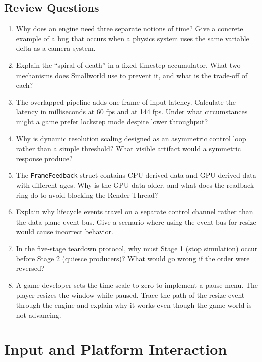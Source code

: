 \documentclass[
  11pt,
  letterpaper,
  DIV=11,
  numbers=noendperiod,
  twoside,
  open=right]{scrreprt}
\begin{document}
\section*{Review Questions}\label{review-questions-3}


\begin{enumerate}
\def\labelenumi{\arabic{enumi}.}
\item
  Why does an engine need three separate notions of time? Give a
  concrete example of a bug that occurs when a physics system uses the
  same variable delta as a camera system.
\item
  Explain the ``spiral of death'' in a fixed-timestep accumulator. What
  two mechanisms does Smallworld use to prevent it, and what is the
  trade-off of each?
\item
  The overlapped pipeline adds one frame of input latency. Calculate the
  latency in milliseconds at 60 fps and at 144 fps. Under what
  circumstances might a game prefer lockstep mode despite lower
  throughput?
\item
  Why is dynamic resolution scaling designed as an asymmetric control
  loop rather than a simple threshold? What visible artifact would a
  symmetric response produce?
\item
  The \texttt{FrameFeedback} struct contains CPU-derived data and
  GPU-derived data with different ages. Why is the GPU data older, and
  what does the readback ring do to avoid blocking the Render Thread?
\item
  Explain why lifecycle events travel on a separate control channel
  rather than the data-plane event bus. Give a scenario where using the
  event bus for resize would cause incorrect behavior.
\item
  In the five-stage teardown protocol, why must Stage 1 (stop
  simulation) occur before Stage 2 (quiesce producers)? What would go
  wrong if the order were reversed?
\item
  A game developer sets the time scale to zero to implement a pause
  menu. The player resizes the window while paused. Trace the path of
  the resize event through the engine and explain why it works even
  though the game world is not advancing.
\end{enumerate}

\chapter{Input and Platform
Interaction}\label{input-and-platform-interaction}
\end{document}
